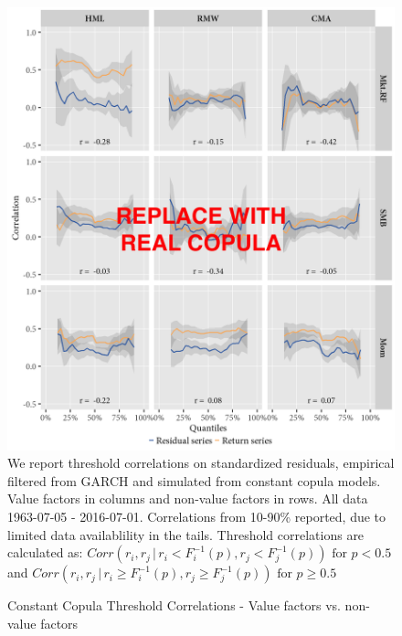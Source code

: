 \begin{figure}[H]
  \caption{Constant Copula Threshold Correlations - Value factors vs. non-value factors}
  \label{diag:thresholdnonvalue_copula}
  \centering
  \begin{minipage}{\textwidth}
  \includegraphics[scale=1]{graphics/threshold_Nonvalue_copula.png}  
  \vspace{3mm}
  \footnotesize
  We report threshold correlations on standardized residuals, empirical filtered from GARCH and simulated from constant copula models. Value factors in columns and non-value factors in rows. All data 1963-07-05 - 2016-07-01. Correlations from 10-90\% reported, due to limited data availablility in the tails. Threshold correlations are calculated as: $Corr(r_i, r_j \,|\, r_i < F_i^{-1}(p), r_j < F_j^{-1}(p)) \text{ for } p < 0.5$ and $Corr(r_i, r_j \,|\, r_i \geq F_i^{-1}(p), r_j \geq F_j^{-1}(p)) \text{ for } p \geq 0.5$ 
  \end{minipage}
\end{figure}
